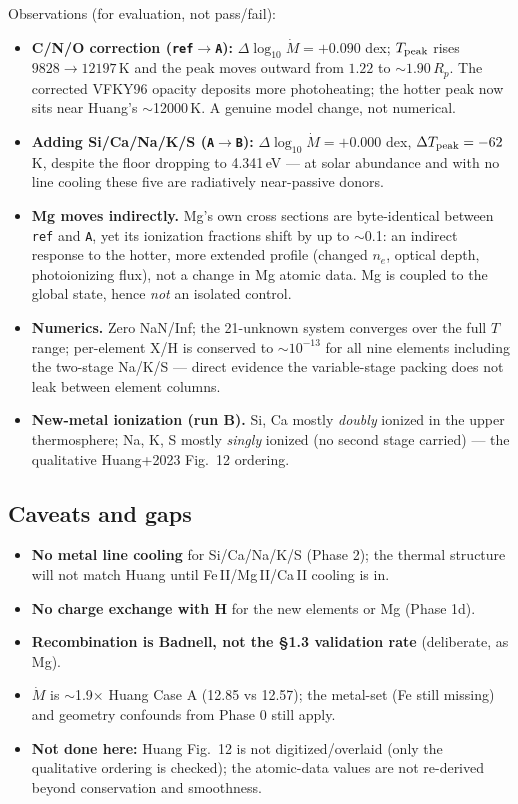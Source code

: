 \documentclass[english,a4paper]{kiseon_memo}
\begin{document}
Observations (for evaluation, not pass/fail):
\begin{itemize}
\item \textbf{C/N/O correction (\texttt{ref}$\rightarrow$\texttt{A}):}
  $\Delta\log_{10}\dot M = +0.090$ dex; $T_{\rm peak}$ rises $9828\rightarrow12197$\,K
  and the peak moves outward from $1.22$ to $\sim1.90\,R_p$. The corrected VFKY96
  opacity deposits more photoheating; the hotter peak now sits near Huang's
  $\sim$12000\,K. A genuine model change, not numerical.
\item \textbf{Adding Si/Ca/Na/K/S (\texttt{A}$\rightarrow$\texttt{B}):}
  $\Delta\log_{10}\dot M = +0.000$ dex, $\Delta T_{\rm peak} = -62$\,K, despite
  the floor dropping to 4.341\,eV --- at solar abundance and with no line cooling
  these five are radiatively near-passive donors.
\item \textbf{Mg moves indirectly.} Mg's own cross sections are byte-identical
  between \texttt{ref} and \texttt{A}, yet its ionization fractions shift by up to
  $\sim$0.1: an indirect response to the hotter, more extended profile (changed
  $n_e$, optical depth, photoionizing flux), not a change in Mg atomic data. Mg
  is coupled to the global state, hence \emph{not} an isolated control.
\item \textbf{Numerics.} Zero NaN/Inf; the 21-unknown system converges over the
  full $T$ range; per-element X/H is conserved to $\sim10^{-13}$ for all nine
  elements including the two-stage Na/K/S --- direct evidence the variable-stage
  packing does not leak between element columns.
\item \textbf{New-metal ionization (run B).} Si, Ca mostly \emph{doubly} ionized
  in the upper thermosphere; Na, K, S mostly \emph{singly} ionized (no second
  stage carried) --- the qualitative Huang+2023 Fig.~12 ordering.
\end{itemize}

\subsection{Caveats and gaps}

\begin{itemize}
\item \textbf{No metal line cooling} for Si/Ca/Na/K/S (Phase 2); the thermal
  structure will not match Huang until Fe\,II/Mg\,II/Ca\,II cooling is in.
\item \textbf{No charge exchange with H} for the new elements or Mg (Phase 1d).
\item \textbf{Recombination is Badnell, not the \S1.3 validation rate}
  (deliberate, as Mg).
\item $\dot M$ is $\sim$1.9$\times$ Huang Case A (12.85 vs 12.57); the metal-set
  (Fe still missing) and geometry confounds from Phase 0 still apply.
\item \textbf{Not done here:} Huang Fig.~12 is not digitized/overlaid (only the
  qualitative ordering is checked); the atomic-data values are not re-derived
  beyond conservation and smoothness.
\end{itemize}
\end{document}
